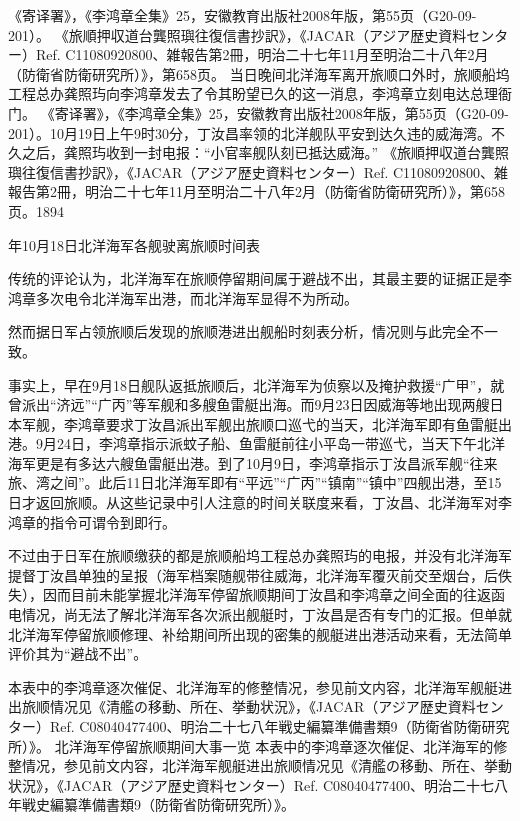 \documentclass[12pt,UTF8]{ctexbook}
\begin{document}
《寄译署》，《李鸿章全集》25，安徽教育出版社2008年版，第55页（G20-09-201）。
《旅順押収道台龔照璵往復信書抄訳》，《JACAR（アジア歴史資料センター）Ref. C11080920800、雑報告第2冊，明治二十七年11月至明治二十八年2月（防衛省防衛研究所）》，第658页。
当日晚间北洋海军离开旅顺口外时，旅顺船坞工程总办龚照玙向李鸿章发去了令其盼望已久的这一消息，李鸿章立刻电达总理衙门。 《寄译署》，《李鸿章全集》25，安徽教育出版社2008年版，第55页（G20-09-201）。10月19日上午9时30分，丁汝昌率领的北洋舰队平安到达久违的威海湾。不久之后，龚照玙收到一封电报：“小官率舰队刻已抵达威海。” 《旅順押収道台龔照璵往復信書抄訳》，《JACAR（アジア歴史資料センター）Ref. C11080920800、雑報告第2冊，明治二十七年11月至明治二十八年2月（防衛省防衛研究所）》，第658页。1894

年10月18日北洋海军各舰驶离旅顺时间表


传统的评论认为，北洋海军在旅顺停留期间属于避战不出，其最主要的证据正是李鸿章多次电令北洋海军出港，而北洋海军显得不为所动。

然而据日军占领旅顺后发现的旅顺港进出舰船时刻表分析，情况则与此完全不一致。

事实上，早在9月18日舰队返抵旅顺后，北洋海军为侦察以及掩护救援“广甲”，就曾派出“济远”“广丙”等军舰和多艘鱼雷艇出海。而9月23日因威海等地出现两艘日本军舰，李鸿章要求丁汝昌派出军舰出旅顺口巡弋的当天，北洋海军即有鱼雷艇出港。9月24日，李鸿章指示派蚊子船、鱼雷艇前往小平岛一带巡弋，当天下午北洋海军更是有多达六艘鱼雷艇出港。到了10月9日，李鸿章指示丁汝昌派军舰“往来旅、湾之间”。此后11日北洋海军即有“平远”“广丙”“镇南”“镇中”四舰出港，至15日才返回旅顺。从这些记录中引人注意的时间关联度来看，丁汝昌、北洋海军对李鸿章的指令可谓令到即行。

不过由于日军在旅顺缴获的都是旅顺船坞工程总办龚照玙的电报，并没有北洋海军提督丁汝昌单独的呈报（海军档案随舰带往威海，北洋海军覆灭前交至烟台，后佚失），因而目前未能掌握北洋海军停留旅顺期间丁汝昌和李鸿章之间全面的往返函电情况，尚无法了解北洋海军各次派出舰艇时，丁汝昌是否有专门的汇报。但单就北洋海军停留旅顺修理、补给期间所出现的密集的舰艇进出港活动来看，无法简单评价其为“避战不出”。

本表中的李鸿章逐次催促、北洋海军的修整情况，参见前文内容，北洋海军舰艇进出旅顺情况见《清艦の移動、所在、挙動状況》，《JACAR（アジア歴史資料センター）Ref. C08040477400、明治二十七八年戦史編纂準備書類9（防衛省防衛研究所）》。
北洋海军停留旅顺期间大事一览 本表中的李鸿章逐次催促、北洋海军的修整情况，参见前文内容，北洋海军舰艇进出旅顺情况见《清艦の移動、所在、挙動状況》，《JACAR（アジア歴史資料センター）Ref. C08040477400、明治二十七八年戦史編纂準備書類9（防衛省防衛研究所）》。
\end{document}
